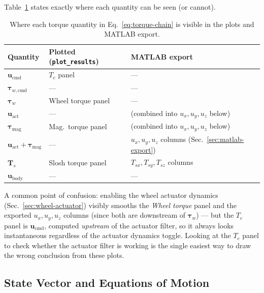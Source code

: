 Table~\ref{tab:torque-visibility} states exactly where each quantity can
be seen (or cannot).

\begin{table}[h]
\centering
\caption{Where each torque quantity in Eq.~\ref{eq:torque-chain} is
visible in the plots and MATLAB export.}
\label{tab:torque-visibility}
\begin{tabular}{@{}lll@{}}
\toprule
\textbf{Quantity} & \textbf{Plotted (\texttt{plot\_results})} & \textbf{MATLAB export} \\
\midrule
$\bm{u}_{\text{cmd}}$      & $T_c$ panel               & --- \\
$\bm{\tau}_{w,\text{cmd}}$ & ---                        & --- \\
$\bm{\tau}_w$              & Wheel torque panel         & --- \\
$\bm{u}_{\text{act}}$      & ---                        & (combined into $u_x,u_y,u_z$ below) \\
$\bm{\tau}_{\text{mag}}$   & Mag.\ torque panel         & (combined into $u_x,u_y,u_z$ below) \\
$\bm{u}_{\text{act}}+\bm{\tau}_{\text{mag}}$ & ---       & $u_x,u_y,u_z$ columns (Sec.~\ref{sec:matlab-export}) \\
$\bm{T}_{\!s}$             & Slosh torque panel         & $T_{sx},T_{sy},T_{sz}$ columns \\
$\bm{u}_{\text{body}}$     & ---                        & --- \\
\bottomrule
\end{tabular}
\end{table}

A common point of confusion: enabling the wheel actuator dynamics
(Sec.~\ref{sec:wheel-actuator}) visibly smooths the \emph{Wheel torque}
panel and the exported $u_x,u_y,u_z$ columns (since both are downstream
of $\bm{\tau}_w$) --- but the $T_c$ panel is $\bm{u}_{\text{cmd}}$,
computed \emph{upstream} of the actuator filter, so it always looks
instantaneous regardless of the actuator dynamics toggle. Looking at the
$T_c$ panel to check whether the actuator filter is working is the
single easiest way to draw the wrong conclusion from these plots.


\subsection{State Vector and Equations of Motion}
\label{sec:state}

